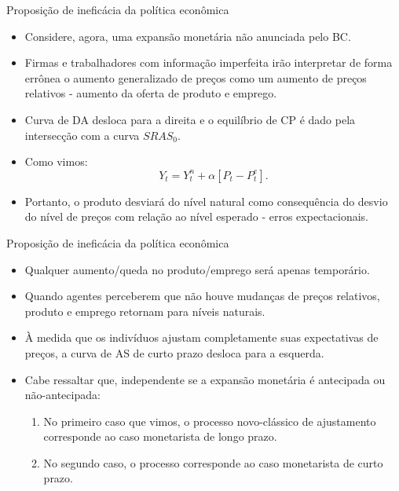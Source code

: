 \documentclass[10pt]{beamer}
\begin{document}
\begin{frame}{Proposição de ineficácia da política econômica}
    \begin{itemize}
        \item Considere, agora, uma expansão monetária não anunciada pelo BC.
        \bigskip
        \item Firmas e trabalhadores com informação imperfeita irão interpretar de forma errônea o aumento generalizado de preços como um aumento de preços relativos - aumento da oferta de produto e emprego.
        \bigskip
        \item Curva de DA desloca para a direita e o equilíbrio de CP é dado pela intersecção com a curva $SRAS_0$.
        \bigskip
        \item Como vimos:
        \begin{equation}
            Y_t = Y_t^n + \alpha[P_t - P_t^e].
            \label{eq6}
        \end{equation}
        \bigskip
        \item Portanto, o produto desviará do nível natural como consequência do desvio do nível de preços com relação ao nível esperado - erros expectacionais.
    \end{itemize}
\end{frame}

\begin{frame}{Proposição de ineficácia da política econômica}
    \begin{itemize}
        \item Qualquer aumento/queda no produto/emprego será apenas temporário.
        \bigskip
        \item Quando agentes perceberem que não houve mudanças de preços relativos, produto e emprego retornam para níveis naturais.
        \bigskip
        \item À medida que os indivíduos ajustam completamente suas expectativas de preços, a curva de AS de curto prazo desloca para a esquerda.
        \bigskip
        \item Cabe ressaltar que, independente se a expansão monetária é antecipada ou não-antecipada:
        \bigskip
        \begin{enumerate}
            \item No primeiro caso que vimos, o processo novo-clássico de ajustamento corresponde ao caso monetarista de longo prazo.
            \bigskip
            \item No segundo caso, o processo corresponde ao caso monetarista de curto prazo.
        \end{enumerate}
    \end{itemize}
\end{frame}
\end{document}

